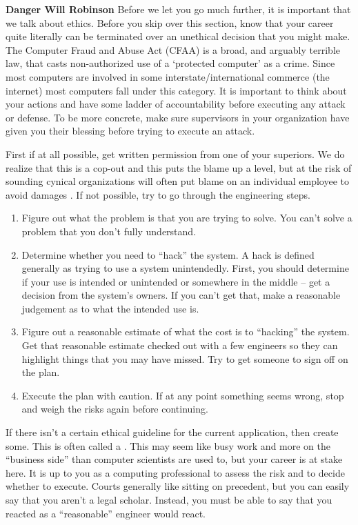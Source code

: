 \textbf{Danger Will Robinson} Before we let you go much further, it is important that we talk about ethics.
Before you skip over this section, know that your career quite literally can be terminated over an unethical decision that you might make.
The Computer Fraud and Abuse Act (CFAA) is a broad, and arguably terrible law, that casts non-authorized use of a `protected computer' as a crime.
Since most computers are involved in some interstate/international commerce (the internet) most computers fall under this category.
It is important to think about your actions and have some ladder of accountability before executing any attack or defense.
To be more concrete, make sure supervisors in your organization have given you their blessing before trying to execute an attack.

First if at all possible, get written permission from one of your superiors.
We do realize that this is a cop-out and this puts the blame up a level, but at the risk of sounding cynical organizations will often put blame on an individual employee to avoid damages .
If not possible, try to go through the engineering steps.

\begin{enumerate}
\item Figure out what the problem is that you are trying to solve.
  You can't solve a problem that you don't fully understand.
\item Determine whether you need to ``hack'' the system.
  A hack is defined generally as trying to use a system unintendedly.
  First, you should determine if your use is intended or unintended or somewhere in the middle -- get a decision from the system's owners.
  If you can't get that, make a reasonable judgement as to what the intended use is.
\item Figure out a reasonable estimate of what the cost is to ``hacking'' the system.
  Get that reasonable estimate checked out with a few engineers so they can highlight things that you may have missed.
  Try to get someone to sign off on the plan.
\item Execute the plan with caution.
  If at any point something seems wrong, stop and weigh the risks again before continuing.
\end{enumerate}

If there isn't a certain ethical guideline for the current application, then create some.
This is often called a .
This may seem like busy work and more on the ``business side'' than computer scientists are used to, but your career is at stake here.
It is up to you as a computing professional to assess the risk and to decide whether to execute.
Courts generally like sitting on precedent, but you can easily say that you aren't a legal scholar.
Instead, you must be able to say that you reacted as a ``reasonable'' engineer would react.

